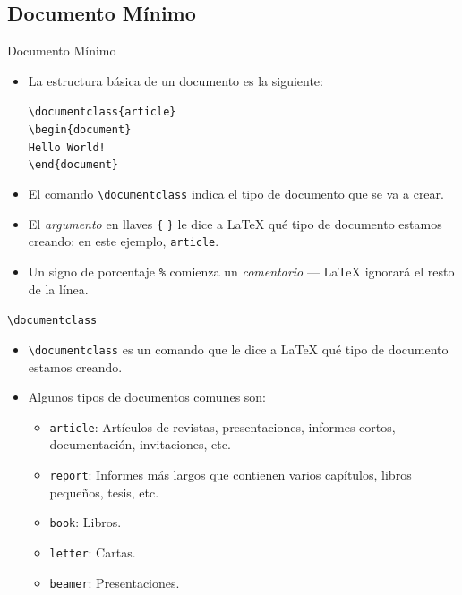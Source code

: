 \documentclass[12pt]{beamer}
\begin{document}
\subsection{Documento Mínimo}
\begin{frame}{Documento Mínimo}
  \begin{itemize}
    \item La estructura básica de un documento es la siguiente:
    \begin{center}
    \begin{minipage}{0.5\textwidth}          
    \begin{block}{}       
       \color{blue}
        \texttt{\textbackslash documentclass\{article\}\\
        \textbackslash begin\{document\}\\
         \hspace{1cm}Hello World!\\
        \textbackslash end\{document\}}
      \end{block}
      \end{minipage}
    \end{center}
    \item<2-> El comando {\color{blue}\texttt{\textbackslash documentclass}} indica el tipo de documento que se va a crear.
    \item<3-> El \emph{argumento} en llaves {\color{blue}\texttt{\{} \texttt{\}}} le dice a \LaTeX{} qué tipo de documento estamos creando: en este ejemplo, {\color{blue}\texttt{article}}.
    \item<4-> Un signo de porcentaje {\color{blue}\texttt{\%}} comienza un \emph{comentario} --- \LaTeX{} ignorará el resto de la línea.
  \end{itemize}
\end{frame}
\begin{frame}{\texttt{\textbackslash documentclass}}
  \begin{itemize}
    \item {\color{blue}\texttt{\textbackslash documentclass}} es un comando que le dice a \LaTeX{} qué tipo de documento estamos creando.
    \item<2-> Algunos tipos de documentos comunes son:
    \begin{itemize}
      \item {\color{blue}\texttt{article}}: Artículos de revistas, presentaciones, informes cortos, documentación, invitaciones, etc.
      \item<3-> {\color{blue}\texttt{report}}: Informes más largos que contienen varios capítulos, libros pequeños, tesis, etc.
      \item<4-> {\color{blue}\texttt{book}}: Libros.
      \item<5-> {\color{blue}\texttt{letter}}: Cartas.
      \item<6-> {\color{blue}\texttt{beamer}}: Presentaciones.
    \end{itemize}
  \end{itemize}
\end{frame}
\end{document}
